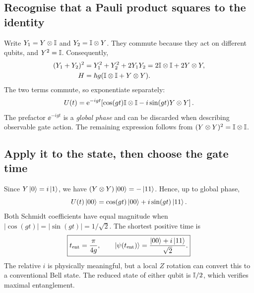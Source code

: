 \subsection{Recognise that a Pauli product squares to the identity}
Write $Y_1=Y\otimes\mathbb{I}$ and $Y_2=\mathbb{I}\otimes Y$. They commute because they act on different qubits, and $Y^2=\mathbb{I}$. Consequently,
\begin{align}
(Y_1+Y_2)^2&=Y_1^2+Y_2^2+2Y_1Y_2=2\mathbb{I}\otimes\mathbb{I}+2Y\otimes Y,\\
H&=\hbar g(\mathbb{I}\otimes\mathbb{I}+Y\otimes Y).\label{eq:yyH}
\end{align}
The two terms commute, so exponentiate separately:
\begin{equation}
U(t)=\mathrm{e}^{-igt}\!\left[\cos(gt)\mathbb{I}\otimes\mathbb{I}-i\sin(gt)Y\otimes Y\right].\label{eq:yyU}
\end{equation}
The prefactor $\ee^{-igt}$ is a \emph{global phase} and can be discarded when describing observable gate action. The remaining expression follows from $(Y\otimes Y)^2=\mathbb{I}\otimes\mathbb{I}$.

\subsection{Apply it to the state, then choose the gate time}
Since $Y\left\lvert 0\right\rangle=i\left\lvert 1\right\rangle$, we have $(Y\otimes Y)\left\lvert 00\right\rangle=-\left\lvert 11\right\rangle$. Hence, up to global phase,
\begin{equation}
U(t)\left\lvert 00\right\rangle=\cos(gt)\left\lvert 00\right\rangle+i\sin(gt)\left\lvert 11\right\rangle.\label{eq:yyout}
\end{equation}
Both Schmidt coefficients have equal magnitude when $|\cos(gt)|=|\sin(gt)|=1/\sqrt2$. The shortest positive time is
\begin{equation}
\boxed{t_{\rm ent}=\frac{\pi}{4g},\qquad
\left\lvert \psi(t_{\rm ent})\right\rangle=\frac{\left\lvert 00\right\rangle+i\left\lvert 11\right\rangle}{\sqrt2}.}
\end{equation}
The relative $i$ is physically meaningful, but a local $Z$ rotation can convert this to a conventional Bell state. The reduced state of either qubit is $\mathbb{I}/2$, which verifies maximal entanglement.


